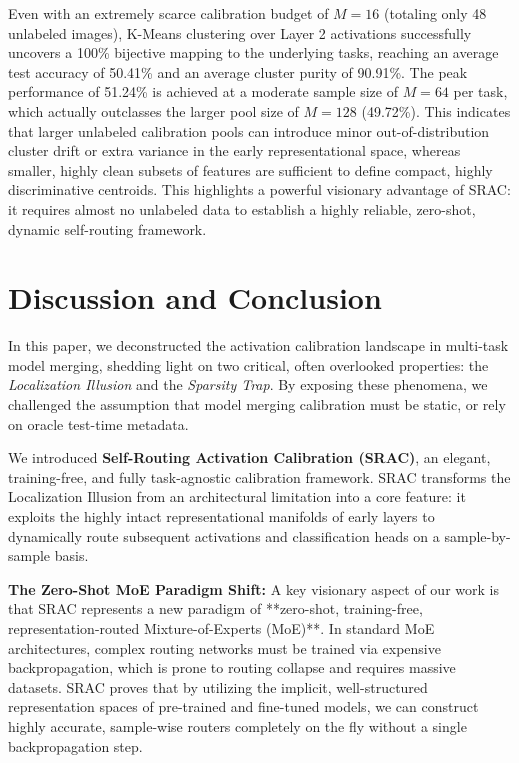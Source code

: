 \documentclass{article}
\theoremstyle{plain}
\theoremstyle{definition}
\theoremstyle{remark}
\begin{document}
Even with an extremely scarce calibration budget of $M = 16$ (totaling only 48 unlabeled images), K-Means clustering over Layer 2 activations successfully uncovers a 100\% bijective mapping to the underlying tasks, reaching an average test accuracy of 50.41\% and an average cluster purity of 90.91\%. The peak performance of 51.24\% is achieved at a moderate sample size of $M = 64$ per task, which actually outclasses the larger pool size of $M = 128$ (49.72\%). This indicates that larger unlabeled calibration pools can introduce minor out-of-distribution cluster drift or extra variance in the early representational space, whereas smaller, highly clean subsets of features are sufficient to define compact, highly discriminative centroids. This highlights a powerful visionary advantage of SRAC: it requires almost no unlabeled data to establish a highly reliable, zero-shot, dynamic self-routing framework.

\section{Discussion and Conclusion}
\label{sec:conclusion}

In this paper, we deconstructed the activation calibration landscape in multi-task model merging, shedding light on two critical, often overlooked properties: the \emph{Localization Illusion} and the \emph{Sparsity Trap}. By exposing these phenomena, we challenged the assumption that model merging calibration must be static, or rely on oracle test-time metadata. 

We introduced \textbf{Self-Routing Activation Calibration (SRAC)}, an elegant, training-free, and fully task-agnostic calibration framework. SRAC transforms the Localization Illusion from an architectural limitation into a core feature: it exploits the highly intact representational manifolds of early layers to dynamically route subsequent activations and classification heads on a sample-by-sample basis. 

\textbf{The Zero-Shot MoE Paradigm Shift:} 
A key visionary aspect of our work is that SRAC represents a new paradigm of **zero-shot, training-free, representation-routed Mixture-of-Experts (MoE)**. In standard MoE architectures, complex routing networks must be trained via expensive backpropagation, which is prone to routing collapse and requires massive datasets. SRAC proves that by utilizing the implicit, well-structured representation spaces of pre-trained and fine-tuned models, we can construct highly accurate, sample-wise routers completely on the fly without a single backpropagation step.
\end{document}
